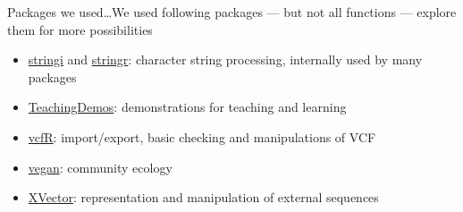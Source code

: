 \documentclass[compress, ucs, xelatex, 11pt, xcolor=svgnames,
  hyperref={
    bookmarks=true,
    unicode=true,
    colorlinks=true,
    pdftitle={Molecular data in R},
    plainpages=false,
    pdfauthor={Vojtech Zeisek},
    pdfsubject={Course about phylogeny and evolution in R},
    pdfcreator={XeLaTeX},
    pdfkeywords={R, evolution, phylogeny, molecular data},
    linkcolor=Tomato,
    anchorcolor=SaddleBrown,
    citecolor=Goldenrod,
    filecolor=DarkMagenta,
    menucolor=Sienna,
    urlcolor=DarkTurquoise,
    pdftex},
  url={hyphens, lowtilde} %
  ]{beamer}
\begin{document}
\begin{frame}[allowframebreaks]{Packages we used\ldots}{We used following packages --- but not all functions --- explore them for more possibilities}
\begin{itemize}
    \item \href{https://CRAN.R-project.org/package=stringi}{stringi} and \href{https://CRAN.R-project.org/package=stringr}{stringr}: character string processing, internally used by many packages 
    \item \href{https://CRAN.R-project.org/package=TeachingDemos}{TeachingDemos}: demonstrations for teaching and learning
    \item \href{https://CRAN.R-project.org/package=vcfR}{vcfR}: import/export, basic checking and manipulations of VCF
    \item \href{https://CRAN.R-project.org/package=vegan}{vegan}: community ecology
    \item \href{https://www.bioconductor.org/packages/3.4/bioc/html/XVector.html}{XVector}: representation and manipulation of external sequences
  \end{itemize}
\end{frame}
\end{document}

